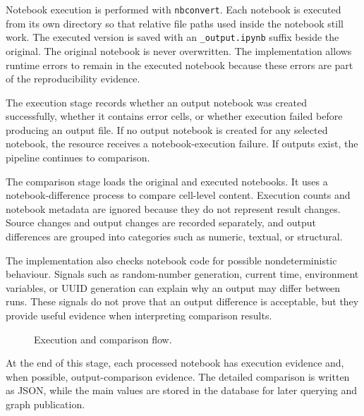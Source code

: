 Notebook execution is performed with \texttt{nbconvert}. Each notebook is executed from its own directory so that relative file paths used inside the notebook still work. The executed version is saved with an \texttt{\_output.ipynb} suffix beside the original. The original notebook is never overwritten. The implementation allows runtime errors to remain in the executed notebook because these errors are part of the reproducibility evidence.

The execution stage records whether an output notebook was created successfully, whether it contains error cells, or whether execution failed before producing an output file. If no output notebook is created for any selected notebook, the resource receives a notebook-execution failure. If outputs exist, the pipeline continues to comparison.

The comparison stage loads the original and executed notebooks. It uses a notebook-difference process to compare cell-level content. Execution counts and notebook metadata are ignored because they do not represent result changes. Source changes and output changes are recorded separately, and output differences are grouped into categories such as numeric, textual, or structural.

The implementation also checks notebook code for possible nondeterministic behaviour. Signals such as random-number generation, current time, environment variables, or UUID generation can explain why an output may differ between runs. These signals do not prove that an output difference is acceptable, but they provide useful evidence when interpreting comparison results.

\begin{figure}[ht]
\centering
{}
\caption{Execution and comparison flow.}
\label{fig:execution-comparison-flow}
\end{figure}

At the end of this stage, each processed notebook has execution evidence and, when possible, output-comparison evidence. The detailed comparison is written as JSON, while the main values are stored in the database for later querying and graph publication.
